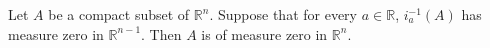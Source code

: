 Let $A$ be a compact subset of $\mathbb{R}^n$. Suppose that for every $a \in \mathbb{R}$, $i_a^{-1}(A)$ has measure zero in $\mathbb{R}^{n-1}$. Then $A$ is of measure zero in $\mathbb{R}^n$.
